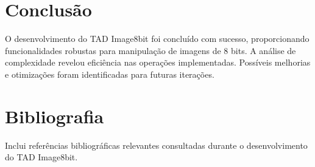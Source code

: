 \documentclass{article}
\begin{document}
\section{Conclusão}

O desenvolvimento do TAD Image8bit foi concluído com sucesso, proporcionando funcionalidades robustas para manipulação de imagens de 8 bits. A análise de complexidade revelou eficiência nas operações implementadas. Possíveis melhorias e otimizações foram identificadas para futuras iterações.

\section{Bibliografia}

Inclui referências bibliográficas relevantes consultadas durante o desenvolvimento do TAD Image8bit.
\end{document}
